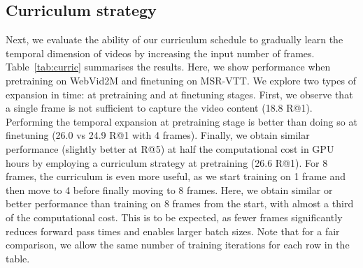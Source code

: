 \subsection{Curriculum strategy}
\label{subsec:curriculumexp}
Next, we evaluate the ability of our curriculum schedule
to gradually learn the temporal dimension of videos
by increasing the input number of frames.
Table~\ref{tab:curric} summarises the results.
Here, we show performance when pretraining on WebVid2M and
finetuning on MSR-VTT.
We explore two types of expansion in time:
at pretraining and at finetuning stages.
First, we observe that a single frame is not sufficient
to capture the video content (18.8 R@1).
Performing the temporal expansion at pretraining stage
is better than doing so at finetuning (26.0 vs 24.9 R@1 with 4 frames).
Finally, we obtain similar performance (slightly better at R@5) at half the computational
cost in GPU hours by employing a curriculum strategy at pretraining (26.6 R@1).
For 8 frames, the curriculum is even more useful, as we start training on 1 frame and then move to 4 before finally moving to 8 frames. Here, we obtain similar or better performance than training on 8 frames from the start, with almost a third of the computational cost. This is to be expected, as fewer frames significantly reduces forward pass times and enables larger batch sizes.
Note that for a fair comparison, we allow the same number of training
iterations for each row in the table.
\begin{table}
\centering
\caption{\textbf{Effect of \#frames and curriculum learning:} The effect of a different number of input frames at pretraining and finetuning.  indicates a within-dataset curriculum learning strategy. Results are presented on the 1K-A MSR-VTT test set for text-video retrieval. Pretraining here is done on WebVid2M only, with a total budget of one epoch through the entire dataset. \textbf{PTT:} total pretraining time in hours.}
\label{tab:curric}
\end{table}

